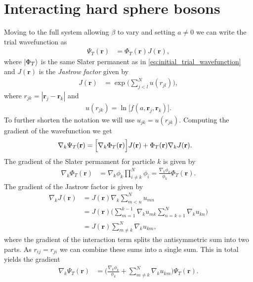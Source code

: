 \documentclass[
    a4paper, aps, twocolumn, floatfix, superscriptaddress, nofootinbib]{revtex4-1}
\newcommand{\vf}{\mathbf}
\newcommand{\1}{\mathds{1}}
\begin{document}
\section{Interacting hard sphere bosons}
    Moving to the full system allowing $\beta$ to vary and setting $a
    \neq 0$ we can write the trial wavefunction as
    \begin{align}
        \Psi_T(\vf{r})
        &=
        \Phi_T(\vf{r})
        J(\vf{r}),
    \end{align}
    where $\ket{\Phi_T}$ is the same Slater permanent as in
    \autoref{eq:initial_trial_wavefunction} and $J(\vf{r})$ is the
    \textit{Jastrow factor} given by
    \begin{align}
        J(\vf{r})
        &=
        \exp\Biggl(
            \sum_{j < l}^N u(r_{jl})
        \Biggr),
    \end{align}
    where $r_{jk} = |\vf{r}_j - \vf{r}_k|$ and
    \begin{align}
        u(r_{jk}) = \ln\bigl[f(a, \vf{r}_j, \vf{r}_k)\bigr].
    \end{align}
    To further shorten the notation we will use $u_{jk} = u(r_{jk})$. Computing
    the gradient of the wavefunction we get
    \begin{align}
        \nabla_k\Psi_T(\vf{r})
        &=
        \Bigl[
            \nabla_k
            \Phi_T(\vf{r})
        \Bigr]
        J(\vf{r})
        + \Phi_T(\vf{r})
        \nabla_k J(\vf{r}).
    \end{align}
    The gradient of the Slater permament for particle $k$ is given by
    \begin{align}
        \nabla_k
        \Phi_T(\vf{r})
        &=
        \nabla_k\phi_k
        \prod_{i \neq k}^N\phi_i
        = \frac{\nabla_k\phi_k}{\phi_k}
        \Phi_T(\vf{r}).
    \end{align}
    The gradient of the Jastrow factor is given by
    \begin{align}
        \nabla_k J(\vf{r})
        &=
        J(\vf{r})
        \nabla_k\sum_{m < n}^N u_{mn} \\
        &= J(\vf{r})
        \Biggl(
            \sum_{m = 1}^{k - 1}\nabla_k u_{mk}
            \sum_{n = k + 1}^N\nabla_k u_{kn}
        \Biggr)
        \\
        &=
        J(\vf{r})
        \sum_{m \neq k}^N\nabla_k u_{km},
    \end{align}
    where the gradient of the interaction term splits the antisymmetric
    sum into two parts. As $r_{ij} = r_{ji}$ we can combine these sums
    into a single sum. This in total yields the gradient
    \begin{align}
        \nabla_k\Psi_T(\vf{r})
        &=
        \Biggl(
            \frac{\nabla_k\phi_k}{\phi_k}
            + \sum_{m \neq k}^N
            \nabla_k u_{km}
        \Biggr)
        \Psi_T(\vf{r}).
        \label{eq:gradient_full_wavefunction}
    \end{align}
\end{document}
